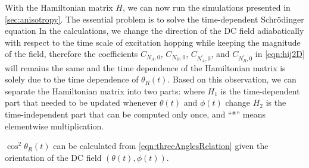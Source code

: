 With the Hamiltonian matrix $H$, we can now run the simulations presented in \autoref{sec:anisotropy}. The 
essential problem is to solve the time-dependent Schr{\"o}dinger equation
In the calculations, we change the direction of the DC field adiabatically with respect to the time scale of excitation
 hopping while keeping the magnitude of the field, therefore the coefficients $C_{N_A, 0}$, $C_{N_B, 0}$, $C_{N_A^{'}, 0}$, and $C_{N_B^{'}, 0}$ in \autoref{eqn:hij2D} will remains the same and the time dependence of
the Hamiltonian matrix is solely due to the time dependence of $\theta_{R}(t)$. Based on this observation, we can
separate the Hamiltonian matrix into two parts: 
where $H_{1}$ is the time-dependent part that needed to be updated whenever $\theta(t)$ and $\phi(t)$ change
$H_{2}$ is the time-independent part that can be computed only once, and ``*'' means elementwise multiplication. 

$\cos^2 \theta_{R}(t)$ can be 
calculated from \autoref{eqn:threeAnglesRelation} given the orientation of the DC field $(\theta(t), \phi(t) )$.



